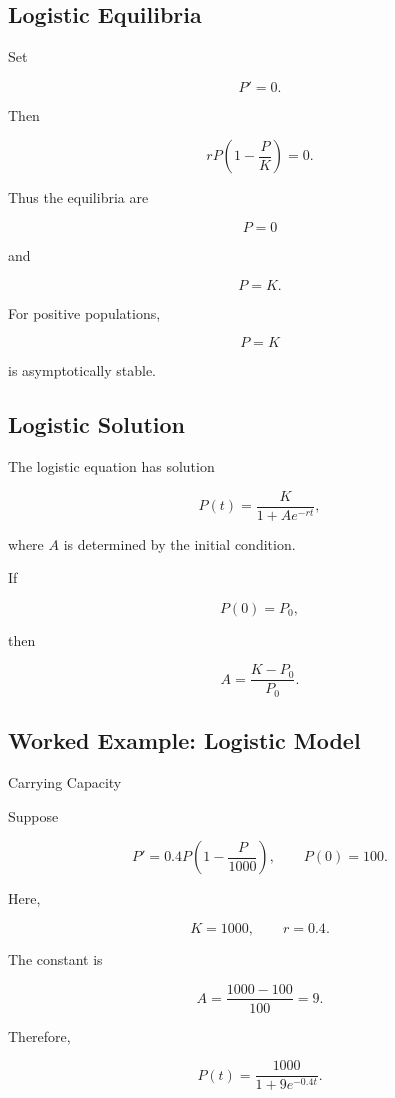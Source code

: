 \subsection{Logistic Equilibria}
\label{subsec:logistic-equilibria}

Set

\[
P'=0.
\]

Then

\[
rP
\left(
1-\frac{P}{K}
\right)
=
0.
\]

Thus the equilibria are

\[
\boxed{
P=0
}
\]

and

\[
\boxed{
P=K.
}
\]

For positive populations,

\[
P=K
\]

is asymptotically stable.

\subsection{Logistic Solution}
\label{subsec:logistic-solution}

The logistic equation has solution

\[
\boxed{
P(t)
=
\frac{
K
}{
1+Ae^{-rt}
},
}
\]

where \(A\) is determined by the initial condition.

If

\[
P(0)=P_0,
\]

then

\[
\boxed{
A
=
\frac{
K-P_0
}{
P_0
}.
}
\]

\subsection{Worked Example: Logistic Model}
\label{subsec:worked-logistic-model}

\begin{workedexamplebox}{Carrying Capacity}

Suppose

\[
P'
=
0.4P
\left(
1-\frac{P}{1000}
\right),
\qquad
P(0)=100.
\]

Here,

\[
K=1000,
\qquad
r=0.4.
\]

The constant is

\[
A
=
\frac{
1000-100
}{
100
}
=
9.
\]

Therefore,

\begin{answerbox}
\[
\boxed{
P(t)
=
\frac{
1000
}{
1+9e^{-0.4t}
}.
}
\]
\end{answerbox}

\end{workedexamplebox}

